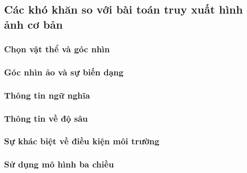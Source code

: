 \subsection{Các khó khăn so với bài toán truy xuất hình ảnh cơ bản}

\subsubsection{Chọn vật thể và góc nhìn}

\subsubsection{Góc nhìn ảo và sự biến dạng}

\subsubsection{Thông tin ngữ nghĩa}

\subsubsection{Thông tin về độ sâu}

\subsubsection{Sự khác biệt về điều kiện môi trường}

\subsubsection{Sử dụng mô hình ba chiều}
